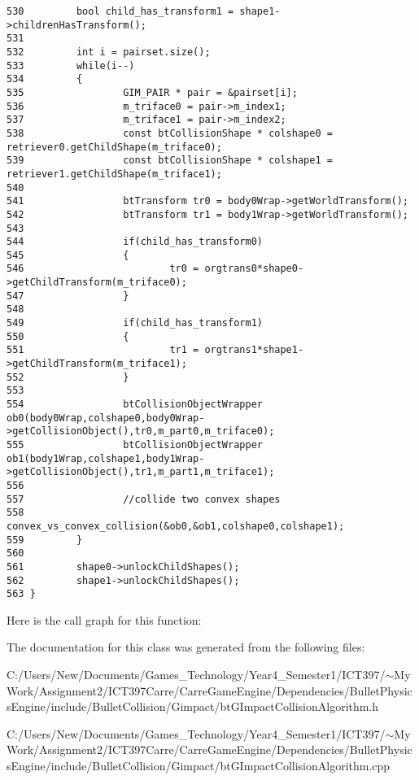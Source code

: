 \begin{Code}
\begin{verbatim}
530         bool child_has_transform1 = shape1->childrenHasTransform();
531 
532         int i = pairset.size();
533         while(i--)
534         {
535                 GIM_PAIR * pair = &pairset[i];
536                 m_triface0 = pair->m_index1;
537                 m_triface1 = pair->m_index2;
538                 const btCollisionShape * colshape0 = retriever0.getChildShape(m_triface0);
539                 const btCollisionShape * colshape1 = retriever1.getChildShape(m_triface1);
540 
541                 btTransform tr0 = body0Wrap->getWorldTransform();
542                 btTransform tr1 = body1Wrap->getWorldTransform();
543 
544                 if(child_has_transform0)
545                 {
546                         tr0 = orgtrans0*shape0->getChildTransform(m_triface0);
547                 }
548 
549                 if(child_has_transform1)
550                 {
551                         tr1 = orgtrans1*shape1->getChildTransform(m_triface1);
552                 }
553 
554                 btCollisionObjectWrapper ob0(body0Wrap,colshape0,body0Wrap->getCollisionObject(),tr0,m_part0,m_triface0);
555                 btCollisionObjectWrapper ob1(body1Wrap,colshape1,body1Wrap->getCollisionObject(),tr1,m_part1,m_triface1);
556 
557                 //collide two convex shapes
558                 convex_vs_convex_collision(&ob0,&ob1,colshape0,colshape1);
559         }
560 
561         shape0->unlockChildShapes();
562         shape1->unlockChildShapes();
563 }
\end{verbatim}
\end{Code}




Here is the call graph for this function:

The documentation for this class was generated from the following files:\begin{CompactItemize}
\item 
C:/Users/New/Documents/Games\_\-Technology/Year4\_\-Semester1/ICT397/$\sim$My Work/Assignment2/ICT397Carre/CarreGameEngine/Dependencies/BulletPhysicsEngine/include/BulletCollision/Gimpact/btGImpactCollisionAlgorithm.h\item 
C:/Users/New/Documents/Games\_\-Technology/Year4\_\-Semester1/ICT397/$\sim$My Work/Assignment2/ICT397Carre/CarreGameEngine/Dependencies/BulletPhysicsEngine/include/BulletCollision/Gimpact/btGImpactCollisionAlgorithm.cpp\end{CompactItemize}
